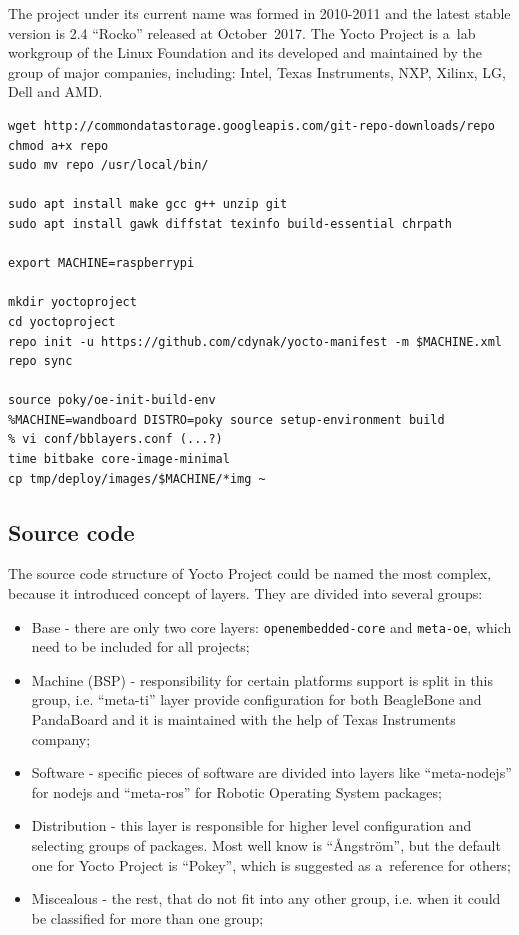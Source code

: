 \documentclass[printmode]{mgr}
\begin{document}
The project under its current name was formed in 2010-2011 and the latest stable version is 2.4 ``Rocko'' released at October~2017. The Yocto Project is a~lab workgroup of the Linux Foundation and its developed and maintained by the group of major companies, including: Intel, Texas Instruments, NXP, Xilinx, LG, Dell and AMD.\cite{web:yoctoproject-participants}\cite{web:yoctoproject-leadership}







\begin{lstlisting}
wget http://commondatastorage.googleapis.com/git-repo-downloads/repo
chmod a+x repo
sudo mv repo /usr/local/bin/

sudo apt install make gcc g++ unzip git
sudo apt install gawk diffstat texinfo build-essential chrpath

export MACHINE=raspberrypi

mkdir yoctoproject
cd yoctoproject
repo init -u https://github.com/cdynak/yocto-manifest -m $MACHINE.xml
repo sync

source poky/oe-init-build-env
%MACHINE=wandboard DISTRO=poky source setup-environment build
% vi conf/bblayers.conf (...?)
time bitbake core-image-minimal
cp tmp/deploy/images/$MACHINE/*img ~
\end{lstlisting}


\subsection*{Source code}

The source code structure of Yocto Project could be named the most complex, because it introduced concept of layers.
They are divided into several groups:
\begin{itemize}
    \itemsep0em
    \item Base - there are only two core layers: \verb|openembedded-core| and \verb|meta-oe|, which need to be included for all projects;
    \item Machine (BSP) - responsibility for certain platforms support is split in this group, i.e. ``meta-ti'' layer provide configuration for both BeagleBone and PandaBoard and it is maintained with the help of Texas Instruments company;
    \item Software - specific pieces of software are divided into layers like ``meta-nodejs'' for nodejs and ``meta-ros'' for Robotic Operating System packages;
    \item Distribution - this layer is responsible for higher level configuration and selecting groups of packages. Most well know is ``Ångström'', but the default one for Yocto Project is ``Pokey'', which is suggested as a~reference for others;
    \item Miscealous - the rest, that do not fit into any other group, i.e. when it could be classified for more than one group;
\end{itemize}
\end{document}
